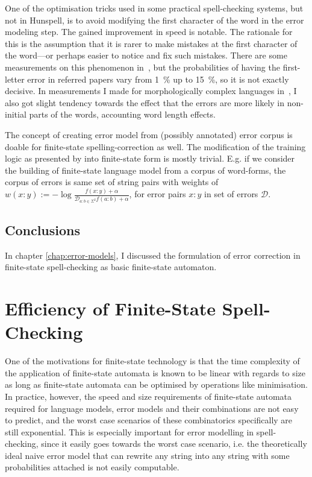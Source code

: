 \documentclass[officiallayout]{unihelcompling}
\begin{document}
One of the optimisation tricks used in some practical spell-checking systems,
but not in Hunspell, is to avoid modifying the first character of the word in
the error modeling step. The gained improvement in speed is notable. The
rationale for this is the assumption that it is rarer to make mistakes at the
first character of the word---or perhaps easier to notice and fix such
mistakes. There are some measurements on this phenomenon
in~\citet{bhagat2007spelling}, but the probabilities of having the first-letter
error in referred papers vary from 1~\% up to 15~\%, so it is not
exactly decisive. In measurements I made for morphologically complex languages
in~, I also got slight tendency towards the
effect that the errors are more likely in non-initial parts of the words,
accounting word length effects.

The concept of creating error model from (possibly annotated) error corpus is
doable for finite-state spelling-correction as well. The modification of the
training logic as presented by \citep{church1991probability} into finite-state
form is mostly trivial. E.g. if we consider the building of finite-state
language model from a corpus of word-forms, the corpus of errors is same set of
string pairs with weights of $w(x:y) := -\log\frac{f(x:y) +
\alpha}{\mathcal{D}_{a:b \in \Sigma^2} f(a:b) + \alpha}$, for error pairs $x:y$
in set of errors $\mathcal{D}$.

\section{Conclusions}

In chapter \ref{chap:error-models}, I discussed the formulation of error
correction in finite-state spell-checking as basic finite-state automaton. 

\chapter{Efficiency of Finite-State Spell-Checking}
\label{chap:efficiency}

One of the motivations for finite-state technology is that the time complexity
of the application of finite-state automata is known to be linear with regards
to size as long as finite-state automata can be optimised by operations like
minimisation. In practice, however, the speed and size requirements of
finite-state automata required for language models, error models and their
combinations are not easy to predict, and the worst case scenarios of these
combinatorics specifically are still exponential. This is especially important
for error modelling in spell-checking, since it easily goes towards the worst
case scenario, i.e. the theoretically ideal naive error model that can rewrite
any string into any string with some probabilities attached is not easily
computable.
\end{document}
